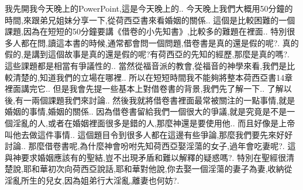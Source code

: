 \documentclass{book}
\begin{document}
我先開我今天晚上的PowerPoint,這是今天晚上的..
今天晚上我們大概用50分鐘的時間,來跟弟兄姐妹分享一下,從荷西亞書來看婚姻的關係..
這個是比較困難的一個課題,因為在短短的50分鐘要講《借卷的小先知書》,比較多的難題在裡面..
特別很多人都在問,讀這本書的時候,通常都會問一個問題,借卷書是真的還是假的呢?.
真的假的,是講到這個故事是真的還是假的呢?有荷西亞的先知的經歷,那麼是真的嗎?.
這些課題都是相當有爭議性的..
當然從福音派的教會,從福音的神學來看,我們是比較清楚的,知道我們的立場在哪裡..
所以在短短時間我不能夠將整本荷西亞書14章裡面講完它..
但是我會先提一些基本上對借卷書的背景,我們先了解一下..
了解以後,有一兩個課題我們來討論..
然後我就將借卷書裡面最常被關注的一點事情,就是婚姻的事情,婚姻的關係..
因為借卷書留給我們一個很大的爭議,就是究竟是不是一個淫亂的人,或者在婚姻裡面很多是錯的人,那麼神還是要使用他..
而且好像是上帝叫他去做這件事情..
這個題目令到很多人都在這邊有些爭論,那麼我們要先來好好討論..
那麼借卷書呢,為什麼神會吩咐先知荷西亞娶淫蕩的女子,過年會吃妻呢?.
這與神要求婚姻應該有的聖結,豈不出現矛盾和難以解釋的疑惑嗎?.
特別在聖經很清楚說,耶和華初次向荷西亞說話,耶和華對他說,你去娶一個淫蕩的妻子為妻,收納從淫亂所生的兒女,因為姐弟行大淫亂,離妻也何妨?.
\end{document}
